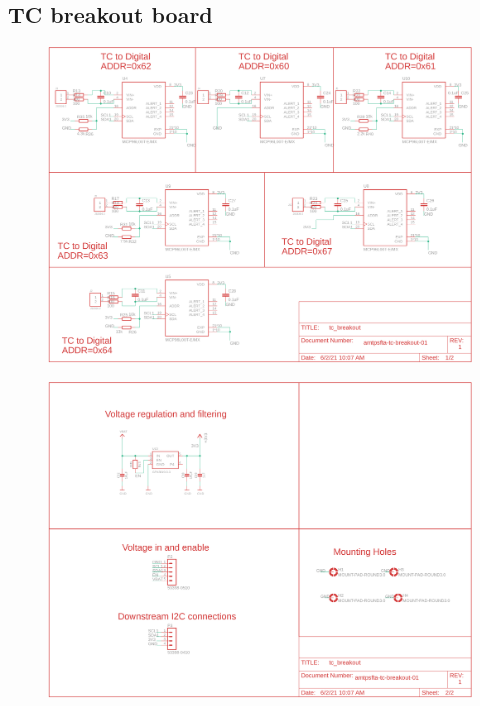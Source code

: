 \documentclass{article}
\begin{document}
\subsection{TC breakout board}

\begin{figure}[H]
	\centering
	\includegraphics[width=\textwidth]{images/tc-breakout-p1}
	\label{fig:schematic-tc-breakout-p1}
\end{figure}

\begin{figure}[H]
	\centering
	\includegraphics[width=\textwidth]{images/tc-breakout-p2}
	\label{fig:schematic-tc-breakout-p2}
\end{figure}
\end{document}
